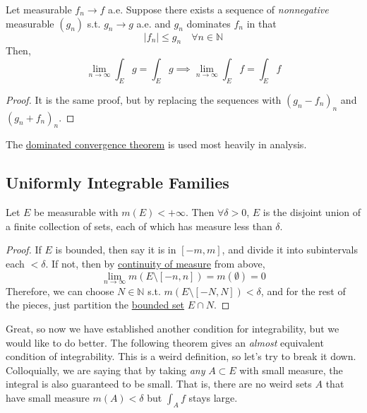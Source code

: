   \begin{theorem}
    \label{thm:generalized-dominated-convergence-theorem}
    Let measurable $f_n \to f$ a.e. Suppose there exists a sequence of \textit{nonnegative} measurable $(g_n)$ s.t. $g_n \to g$ a.e. and $g_n$ dominates $f_n$ in that
    \begin{equation}
      |f_n| \leq g_n \quad \forall n \in \mathbb{N}
    \end{equation}
    Then, 
    \begin{equation}
      \lim_{n \to \infty} \int_E g = \int_E g \implies \lim_{n \to \infty} \int_E f = \int_E f 
    \end{equation}
  \end{theorem}
  \begin{proof}
    It is the same proof, but by replacing the sequences with $(g_n - f_n)_n$ and $(g_n + f_n)_n$. 
  \end{proof}

  The \hyperref[thm:dominated-convergence-theorem]{dominated convergence theorem} is used most heavily in analysis. 

\subsection{Uniformly Integrable Families} 

  \begin{lemma}
    \label{thm:decomposition-of-finite-measure-set-into-delta}
    Let $E$ be measurable with $m(E) < +\infty$. Then $\forall \delta > 0$, $E$ is the disjoint union of a finite collection of sets, each of which has measure less than $\delta$. 
  \end{lemma}
  \begin{proof}
    If $E$ is bounded, then say it is in $[-m, m]$, and divide it into subintervals each $< \delta$. If not, then by \hyperref[thm:continuity-of-measure]{continuity of measure} from above, 
    \begin{equation}
      \lim_{n \to \infty} m(E \setminus [-n, n]) = m(\emptyset) = 0
    \end{equation}
    Therefore, we can choose $N \in \mathbb{N}$ s.t. $m(E \setminus [-N, N]) < \delta$, and for the rest of the pieces, just partition the \hyperref[pst-def:bounded-set]{bounded set} $E \cap N$.   
  \end{proof}

  Great, so now we have established another condition for integrability, but we would like to do better. The following theorem gives an \textit{almost} equivalent condition of integrability. This is a weird definition, so let's try to break it down. Colloquially, we are saying that by taking \textit{any} $A \subset E$ with small measure, the integral is also guaranteed to be small. That is, there are no weird sets $A$ that have small measure $m(A) < \delta$ but $\int_A f$ stays large. 

